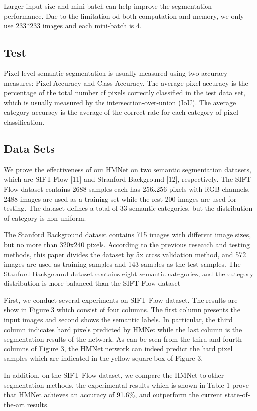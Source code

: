 \documentclass[10.5pt,compsoc]{TsT}
\theoremstyle{mystyle}
\begin{document}
{Larger input size and mini-batch can help improve the segmentation performance. Due to the limitation od both computation and memory, we only use 233*233 images and each mini-batch is 4.

\subsection{Test}
\noindent
Pixel-level semantic segmentation is usually measured using two accuracy measures: Pixel Accuracy and Class Accuracy. The average pixel accuracy is the percentage of the total number of pixels correctly classified in the test data set, which is usually measured by the intersection-over-union (IoU). The average category accuracy is the average of the correct rate for each category of pixel classification.

\subsection{Data Sets}
\noindent
We prove the effectiveness of our HMNet on two semantic segmentation datasets, which are SIFT Flow [11] and Stranford Background [12], respectively. The SIFT Flow dataset contains 2688 samples each has 256x256 pixels with RGB channels. 2488 images are used as a training set while the rest 200 images are used for testing. The dataset defines a total of 33 semantic categories, but the distribution of category is non-uniform.

The Stanford Background dataset contains 715 images with different image sizes, but no more than 320x240 pixels. According to the previous research and testing methods, this paper divides the dataset by 5x cross validation method, and 572 images are used as training samples and 143 samples as the test samples. The Stanford Background dataset contains eight semantic categories, and the category distribution is more balanced than the SIFT Flow dataset

First, we conduct several experiments on SIFT Flow dataset. The results are show in Figure 3 which consist of four columns. The first column presents the input images and second shows the semantic labels. In particular, the third column indicates hard pixels predicted by HMNet while the last column is the segmentation results of the network. As can be seen from the third and fourth columns of Figure 3, the HMNet network can indeed predict the hard pixel samples which are indicated in the yellow square box of Figure 3.

In addition, on the SIFT Flow dataset, we compare the HMNet to other segmentation methods, the experimental results which is shown in Table 1 prove that HMNet achieves an accuracy of 91.6\%, and outperform the current state-of-the-art results.

}
\end{document}
